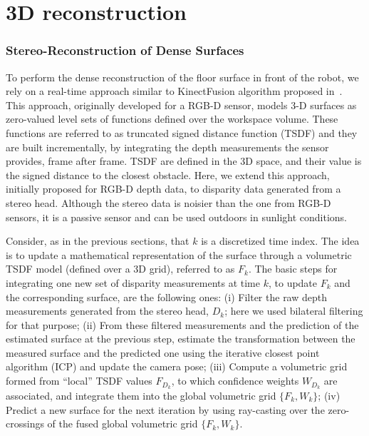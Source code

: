 \chapter{3D reconstruction} 
\label{Chap:3DReconstruction}

\subsection{Stereo-Reconstruction of Dense Surfaces}

To perform the dense reconstruction of the floor surface in front of the robot, we rely on a real-time approach similar to KinectFusion algorithm proposed in~\cite{Newcombe2011}. This approach, originally developed for a RGB-D sensor, models 3-D surfaces as zero-valued level sets of functions defined over the workspace volume. These functions are referred to as truncated signed distance function (TSDF) and they are built incrementally, by integrating the depth measurements the sensor provides, frame after frame. TSDF are defined in the 3D space, and their value is the signed distance to the closest obstacle. Here, we extend this approach, initially proposed for RGB-D depth data, to disparity data generated from a stereo head. Although the stereo data is noisier than the one from RGB-D sensors, it is a passive sensor and can be used outdoors in sunlight conditions.


Consider, as in the previous sections, that $k$ is a discretized time index. The idea is to update a mathematical representation of the surface through a volumetric TSDF model (defined over a 3D grid), referred to as $F_k$. The basic steps for integrating one new set of disparity measurements at time $k$, to update $F_k$ and the corresponding surface, are the following ones: (i) Filter the raw depth measurements generated from the stereo head, $D_k$; here we used bilateral filtering for that purpose; (ii) From these filtered measurements and the prediction of the estimated surface at the previous step, estimate the transformation between the measured surface and the predicted one using the iterative closest point algorithm (ICP) and update the camera pose; (iii) Compute a volumetric grid formed from ``local'' TSDF values $F_{D_k}$, to which confidence weights $W_{D_k}$ are associated, and integrate them into the global volumetric grid $\{F_k,W_k\}$; (iv) Predict a new surface for the next iteration by using ray-casting over the zero-crossings of the fused global volumetric grid $\{F_k,W_k\}$. 


